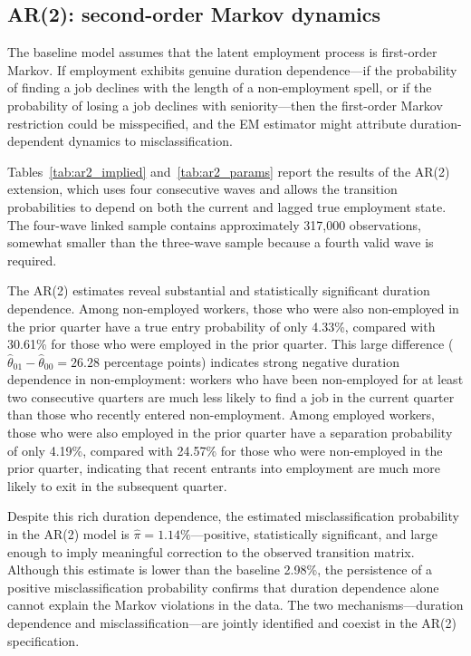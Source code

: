 
\subsection{AR(2): second-order Markov dynamics}\label{subsec:alt:ar2}

The baseline model assumes that the latent employment process is first-order
Markov. If employment exhibits genuine duration dependence---if the probability
of finding a job declines with the length of a non-employment spell, or if
the probability of losing a job declines with seniority---then the first-order
Markov restriction could be misspecified, and the EM estimator might attribute
duration-dependent dynamics to misclassification.

Tables~\ref{tab:ar2_implied} and~\ref{tab:ar2_params} report the results of
the AR(2) extension, which uses four consecutive waves and allows the transition
probabilities to depend on both the current and lagged true employment state.
The four-wave linked sample contains approximately 317,000 observations,
somewhat smaller than the three-wave sample because a fourth valid wave is
required.

The AR(2) estimates reveal substantial and statistically significant duration
dependence. Among non-employed workers, those who were also non-employed in the
prior quarter have a true entry probability of only 4.33\%, compared with
30.61\% for those who were employed in the prior quarter. This large difference
($\hat{\theta}_{01} - \hat{\theta}_{00} = 26.28$ percentage points) indicates
strong negative duration dependence in non-employment: workers who have been
non-employed for at least two consecutive quarters are much less likely to find
a job in the current quarter than those who recently entered non-employment.
Among employed workers, those who were also employed in the prior quarter have
a separation probability of only 4.19\%, compared with 24.57\% for those who
were non-employed in the prior quarter, indicating that recent entrants into
employment are much more likely to exit in the subsequent quarter.

Despite this rich duration dependence, the estimated misclassification probability
in the AR(2) model is $\hat{\pi} = 1.14\%$---positive, statistically significant,
and large enough to imply meaningful correction to the observed transition
matrix. Although this estimate is lower than the baseline 2.98\%, the
persistence of a positive misclassification probability confirms that duration
dependence alone cannot explain the Markov violations in the data. The two
mechanisms---duration dependence and misclassification---are jointly identified
and coexist in the AR(2) specification.

